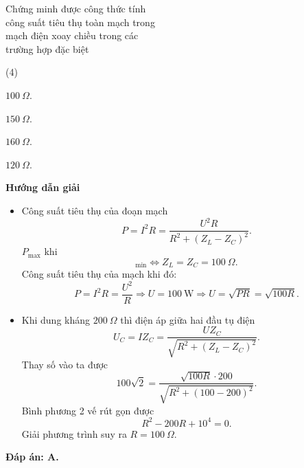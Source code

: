 \begin{dang}{Chứng minh được công thức tính\\ công suất tiêu thụ toàn mạch trong \\mạch điện xoay chiều trong các\\ trường hợp đặc biệt}
{		\begin{mcq}(4)
			\item $100\ \Omega$.
			\item $150\ \Omega$.
			\item $160\ \Omega$.
			\item $120\ \Omega$.
		\end{mcq}
	}
	{\begin{center}
			\textbf{Hướng dẫn giải}
		\end{center}
		
		\begin{itemize}
			\item Công suất tiêu thụ của đoạn mạch
			\begin{equation*}
				P=I^2R=\dfrac{U^2R}{R^2+(Z_L-Z_C)^2}.
			\end{equation*}
			$P_{\text{max}} $ khi
			\begin{equation*}
				[\sqrt {R^2 + (Z_L-Z_C)}]_{\text{min}} \Leftrightarrow Z_L=Z_C=100\ \Omega.
			\end{equation*}
			Công suất tiêu thụ của mạch khi đó:
			\begin{equation*}
				P=I^2R=\dfrac{U^2}{R} \Rightarrow U =100\ \text{W} \Rightarrow U = \sqrt {PR}= \sqrt {100R}.
			\end{equation*}
			\item Khi dung kháng $200\ \Omega$ thì điện áp giữa hai đầu tụ điện 
			\begin{equation*}
				U_C=IZ_C=\dfrac{UZ_C}{\sqrt {R^2 + (Z_L-Z_C)^2}}.
			\end{equation*}
			Thay số vào ta được 
			\begin{equation*}
				100\sqrt 2=\dfrac{\sqrt {100R} \cdot 200}{\sqrt {R^2 + (100-200)^2}}.
			\end{equation*}
			Bình phương 2 vế rút gọn được
			\begin{equation*}
				R^2 -200R +10^4=0.
			\end{equation*}
			Giải phương trình suy ra $R=100\ \Omega$.
		\end{itemize}
		
		\textbf{Đáp án: A.}
	}
	
\end{dang}
